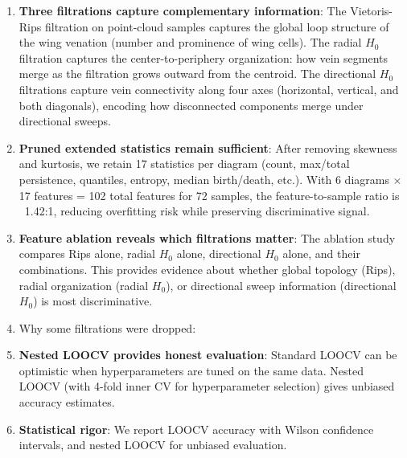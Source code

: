 \documentclass{birkjour}
\theoremstyle{definition}
\theoremstyle{remark}
\numberwithin{equation}{section}
\begin{document}
\begin{enumerate}
    \item  \textbf{Three filtrations capture complementary information}: The Vietoris-Rips filtration on point-cloud samples captures the global loop structure of the wing venation (number and prominence of wing cells). The radial \(H_0\) filtration captures the center-to-periphery organization: how vein segments merge as the filtration grows outward from the centroid. The directional \(H_0\) filtrations capture vein connectivity along four axes (horizontal, vertical, and both diagonals), encoding how disconnected components merge under directional sweeps.

    \item \textbf{Pruned extended statistics remain sufficient}: After removing skewness and kurtosis, we retain 17 statistics per diagram (count, max/total persistence, quantiles, entropy, median birth/death, etc.). With 6 diagrams × 17 features = 102 total features for 72 samples, the feature-to-sample ratio is ~1.42:1, reducing overfitting risk while preserving discriminative signal.

    \item \textbf{Feature ablation reveals which filtrations matter}: The ablation study compares Rips alone, radial \(H_0\) alone, directional \(H_0\) alone, and their combinations. This provides evidence about whether global topology (Rips), radial organization (radial \(H_0\)), or directional sweep information (directional \(H_0\)) is most discriminative.

    \item Why some filtrations were dropped:
    \item \textbf{Nested LOOCV provides honest evaluation}: Standard LOOCV can be optimistic when hyperparameters are tuned on the same data. Nested LOOCV (with 4-fold inner CV for hyperparameter selection) gives unbiased accuracy estimates.

    \item \textbf{Statistical rigor}: We report LOOCV accuracy with Wilson confidence intervals, and nested LOOCV for unbiased evaluation.
\end{enumerate}
\end{document}
